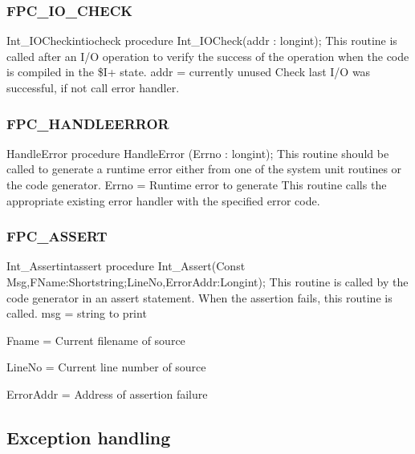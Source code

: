 \documentclass [a4paper,12pt]{article}
\begin{document}
\subsubsection{FPC{\_}IO{\_}CHECK}
\label{subsubsec:mylabel57}

\begin{procedurel}{Int{\_}IOCheck}{intiocheck}
\Declaration
procedure Int{\_}IOCheck(addr : longint);
\Description
This routine is called after an I/O operation to verify the success of the
operation when the code is compiled in the {\$}I+ state.
\Parameters
addr = currently unused
\Algorithm
Check last I/O was successful, if not call error handler.
\end{procedurel}

\subsubsection{FPC{\_}HANDLEERROR}
\label{subsubsec:mylabel58}

\begin{procedure}{HandleError}
\Declaration
procedure HandleError (Errno : longint);
\Description
This routine should be called to generate a runtime error either from one of
the system unit routines or the code generator.
\Parameters
Errno = Runtime error to generate
\Notes
This routine calls the appropriate existing error handler with the specified
error code.
\Algorithm
\end{procedure}

\subsubsection{FPC{\_}ASSERT}
\label{subsubsec:mylabel59}

\begin{procedurel}{Int{\_}Assert}{intassert}
\Declaration
procedure Int{\_}Assert(Const Msg,FName:Shortstring;LineNo,ErrorAddr:Longint);
\Description
This routine is called by the code generator in an assert statement. When
the assertion fails, this routine is called.
\Parameters 
msg = string to print  \par
Fname = Current filename of source \par
LineNo = Current line number of source \par
ErrorAddr = Address of assertion failure
\end{procedurel}

\subsection{Exception handling}
\label{subsec:exception}
\end{document}

